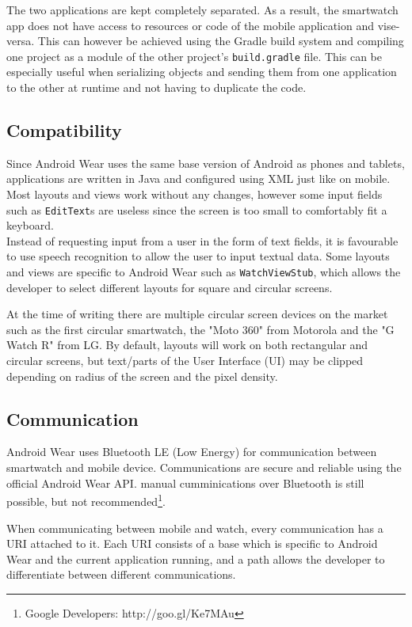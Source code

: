 The two applications are kept completely separated. As a result, the smartwatch
app does not have access to resources or code of the mobile application and
vise-versa. This can however be achieved using the Gradle build system and
compiling one project as a module of the other project's \texttt{build.gradle}
file. This can be especially useful when serializing objects and sending them
from one application to the other at runtime and not having to duplicate the
code.

\subsection{Compatibility}
Since Android Wear uses the same base version of Android as phones and tablets,
applications are written in Java and configured using XML just like on mobile.
Most layouts and views work without any changes, however some input fields such
as \texttt{EditText}s are useless since the screen is too small to comfortably
fit a keyboard.\\
Instead of requesting input from a user in the form of text fields, it is
favourable to use speech recognition to allow the user to input textual data.
Some layouts and views are specific to Android Wear such as
\texttt{WatchViewStub}, which allows the developer to select different layouts
for square and circular screens.

At the time of writing there are multiple circular screen devices on the market
such as the first circular smartwatch, the "Moto 360" from Motorola and the "G
Watch R" from LG. By default, layouts will work on both rectangular and
circular screens, but text/parts of the User Interface (UI) may be clipped
depending on radius of the screen and the pixel density.

\subsection{Communication}
Android Wear uses Bluetooth LE (Low Energy) for communication between
smartwatch and mobile device. Communications are secure and reliable using the
official Android Wear API. manual cumminications over Bluetooth is still
possible, but not recommended\footnote{Google Developers: http://goo.gl/Ke7MAu}.

When communicating between mobile and watch, every communication has a URI
attached to it. Each URI consists of a base which is specific to Android Wear
and the current application running, and a path allows the developer to
differentiate between different communications.

